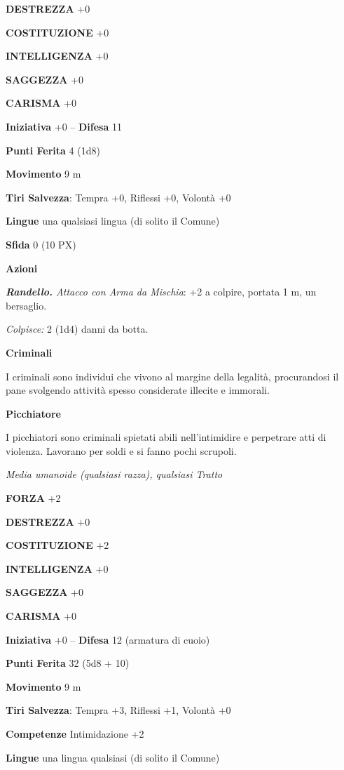 \begin{multicols}{2}
	\textbf{DESTREZZA} +0

	\textbf{COSTITUZIONE} +0

	\textbf{INTELLIGENZA} +0

	\textbf{SAGGEZZA} +0

	\textbf{CARISMA} +0

	\textbf{Iniziativa} +0 -- \textbf{Difesa} 11

	\textbf{Punti Ferita} 4 (1d8)

	\textbf{Movimento} 9 m

	\textbf{Tiri Salvezza}: Tempra +0, Riflessi +0, Volontà +0

	\textbf{Lingue} una qualsiasi lingua (di solito il Comune)

	\textbf{Sfida} 0 (10 PX)

	\textbf{Azioni}

	\textit{\textbf{Randello.} Attacco con Arma da Mischia}: +2 a colpire, portata 1 m, un bersaglio.

	\textit{Colpisce:} 2 (1d4) danni da botta.

	\medskip\textbf{Criminali}

	I criminali sono individui che vivono al margine della legalità, procurandosi il pane svolgendo attività spesso considerate illecite e immorali.

	\medskip\textbf{Picchiatore}

	I picchiatori sono criminali spietati abili nell'intimidire e perpetrare atti di violenza. Lavorano per soldi e si fanno pochi scrupoli.

	\textit{Media umanoide (qualsiasi razza), qualsiasi Tratto}

	\textbf{FORZA} +2

	\textbf{DESTREZZA} +0

	\textbf{COSTITUZIONE} +2

	\textbf{INTELLIGENZA} +0

	\textbf{SAGGEZZA} +0

	\textbf{CARISMA} +0

	\textbf{Iniziativa} +0 -- \textbf{Difesa} 12 (armatura di cuoio)

	\textbf{Punti Ferita} 32 (5d8 + 10)

	\textbf{Movimento} 9 m

	\textbf{Tiri Salvezza}: Tempra +3, Riflessi +1, Volontà +0

	\textbf{Competenze} Intimidazione +2

	\textbf{Lingue} una lingua qualsiasi (di solito il Comune)


\end{multicols}
